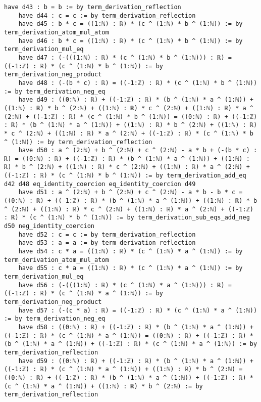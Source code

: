 \documentclass{article}
\begin{document}
\begin{tcolorbox}[colback=white!10, width=\linewidth]
\begin{lstlisting}[language=Lean4]
    have d43 : b = b := by term_derivation_reflection
    have d44 : c = c := by term_derivation_reflection
    have d45 : b * c = ((1:ℕ) : ℝ) * (c ^ (1:ℕ) * b ^ (1:ℕ)) := by term_derivation_atom_mul_atom
    have d46 : b * c = ((1:ℕ) : ℝ) * (c ^ (1:ℕ) * b ^ (1:ℕ)) := by term_derivation_mul_eq
    have d47 : (-(((1:ℕ) : ℝ) * (c ^ (1:ℕ) * b ^ (1:ℕ))) : ℝ) = ((-1:ℤ) : ℝ) * (c ^ (1:ℕ) * b ^ (1:ℕ)) := by term_derivation_neg_product
    have d48 : (-(b * c) : ℝ) = ((-1:ℤ) : ℝ) * (c ^ (1:ℕ) * b ^ (1:ℕ)) := by term_derivation_neg_eq
    have d49 : ((0:ℕ) : ℝ) + ((-1:ℤ) : ℝ) * (b ^ (1:ℕ) * a ^ (1:ℕ)) + ((1:ℕ) : ℝ) * b ^ (2:ℕ) + ((1:ℕ) : ℝ) * c ^ (2:ℕ) + ((1:ℕ) : ℝ) * a ^ (2:ℕ) + ((-1:ℤ) : ℝ) * (c ^ (1:ℕ) * b ^ (1:ℕ)) = ((0:ℕ) : ℝ) + ((-1:ℤ) : ℝ) * (b ^ (1:ℕ) * a ^ (1:ℕ)) + ((1:ℕ) : ℝ) * b ^ (2:ℕ) + ((1:ℕ) : ℝ) * c ^ (2:ℕ) + ((1:ℕ) : ℝ) * a ^ (2:ℕ) + ((-1:ℤ) : ℝ) * (c ^ (1:ℕ) * b ^ (1:ℕ)) := by term_derivation_reflection
    have d50 : a ^ (2:ℕ) + b ^ (2:ℕ) + c ^ (2:ℕ) - a * b + (-(b * c) : ℝ) = ((0:ℕ) : ℝ) + ((-1:ℤ) : ℝ) * (b ^ (1:ℕ) * a ^ (1:ℕ)) + ((1:ℕ) : ℝ) * b ^ (2:ℕ) + ((1:ℕ) : ℝ) * c ^ (2:ℕ) + ((1:ℕ) : ℝ) * a ^ (2:ℕ) + ((-1:ℤ) : ℝ) * (c ^ (1:ℕ) * b ^ (1:ℕ)) := by term_derivation_add_eq d42 d48 eq_identity_coercion eq_identity_coercion d49
    have d51 : a ^ (2:ℕ) + b ^ (2:ℕ) + c ^ (2:ℕ) - a * b - b * c = ((0:ℕ) : ℝ) + ((-1:ℤ) : ℝ) * (b ^ (1:ℕ) * a ^ (1:ℕ)) + ((1:ℕ) : ℝ) * b ^ (2:ℕ) + ((1:ℕ) : ℝ) * c ^ (2:ℕ) + ((1:ℕ) : ℝ) * a ^ (2:ℕ) + ((-1:ℤ) : ℝ) * (c ^ (1:ℕ) * b ^ (1:ℕ)) := by term_derivation_sub_eqs_add_neg d50 neg_identity_coercion
    have d52 : c = c := by term_derivation_reflection
    have d53 : a = a := by term_derivation_reflection
    have d54 : c * a = ((1:ℕ) : ℝ) * (c ^ (1:ℕ) * a ^ (1:ℕ)) := by term_derivation_atom_mul_atom
    have d55 : c * a = ((1:ℕ) : ℝ) * (c ^ (1:ℕ) * a ^ (1:ℕ)) := by term_derivation_mul_eq
    have d56 : (-(((1:ℕ) : ℝ) * (c ^ (1:ℕ) * a ^ (1:ℕ))) : ℝ) = ((-1:ℤ) : ℝ) * (c ^ (1:ℕ) * a ^ (1:ℕ)) := by term_derivation_neg_product
    have d57 : (-(c * a) : ℝ) = ((-1:ℤ) : ℝ) * (c ^ (1:ℕ) * a ^ (1:ℕ)) := by term_derivation_neg_eq
    have d58 : ((0:ℕ) : ℝ) + ((-1:ℤ) : ℝ) * (b ^ (1:ℕ) * a ^ (1:ℕ)) + ((-1:ℤ) : ℝ) * (c ^ (1:ℕ) * a ^ (1:ℕ)) = ((0:ℕ) : ℝ) + ((-1:ℤ) : ℝ) * (b ^ (1:ℕ) * a ^ (1:ℕ)) + ((-1:ℤ) : ℝ) * (c ^ (1:ℕ) * a ^ (1:ℕ)) := by term_derivation_reflection
    have d59 : ((0:ℕ) : ℝ) + ((-1:ℤ) : ℝ) * (b ^ (1:ℕ) * a ^ (1:ℕ)) + ((-1:ℤ) : ℝ) * (c ^ (1:ℕ) * a ^ (1:ℕ)) + ((1:ℕ) : ℝ) * b ^ (2:ℕ) = ((0:ℕ) : ℝ) + ((-1:ℤ) : ℝ) * (b ^ (1:ℕ) * a ^ (1:ℕ)) + ((-1:ℤ) : ℝ) * (c ^ (1:ℕ) * a ^ (1:ℕ)) + ((1:ℕ) : ℝ) * b ^ (2:ℕ) := by term_derivation_reflection

\end{lstlisting}
\end{tcolorbox}
\end{document}
